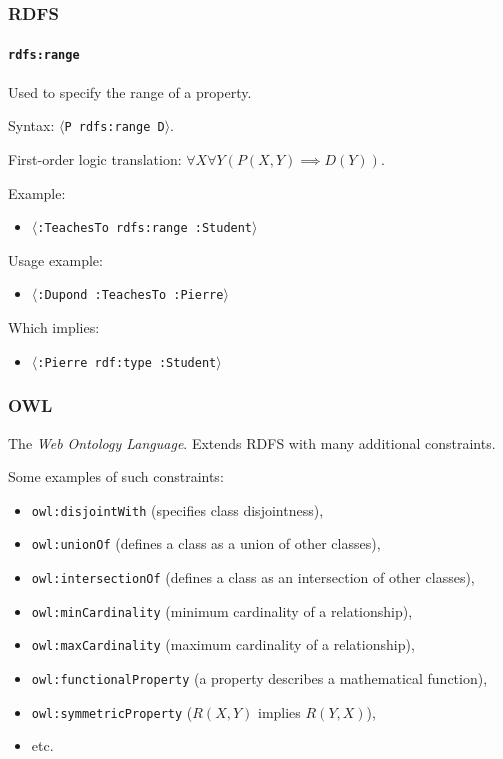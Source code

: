 \documentclass{beamer}
\newcommand{\triplet}[1]{$\langle$\texttt{#1}$\rangle$}
\begin{document}
\begin{frame}
  \frametitle{RDFS}
  \framesubtitle{\texttt{rdfs:range}}

  Used to specify the range of a property.

  \pause

  \bigskip

  Syntax: \triplet{P rdfs:range D}.

  \pause

  \medskip

  First-order logic translation: $\forall X \forall Y (P(X, Y) \implies D(Y))$.

  \pause

  \bigskip

  Example:

  \begin{itemize}
    \item \triplet{:TeachesTo rdfs:range :Student}
  \end{itemize}

  \pause

  Usage example:

  \begin{itemize}
    \item \triplet{:Dupond :TeachesTo :Pierre}
  \end{itemize}

  \pause

  Which implies:

  \begin{itemize}
    \item \triplet{:Pierre rdf:type :Student}
  \end{itemize}
\end{frame}

\begin{frame}
  \frametitle{OWL}

  The \textit{Web Ontology Language}. Extends RDFS with many additional
  constraints.

  \pause

  \medskip

  Some examples of such constraints:

  \pause

  \begin{itemize}
    \item \texttt{owl:disjointWith} (specifies class disjointness),
    \item \texttt{owl:unionOf} (defines a class as a union of other classes),
    \item \texttt{owl:intersectionOf} (defines a class as an intersection of
      other classes),
    \item \texttt{owl:minCardinality} (minimum cardinality of a relationship),
    \item \texttt{owl:maxCardinality} (maximum cardinality of a relationship),
    \item \texttt{owl:functionalProperty} (a property describes a mathematical function),
    \item \texttt{owl:symmetricProperty} ($R(X, Y)$ implies $R(Y, X)$),
    \item etc.
  \end{itemize}
\end{frame}
\end{document}

